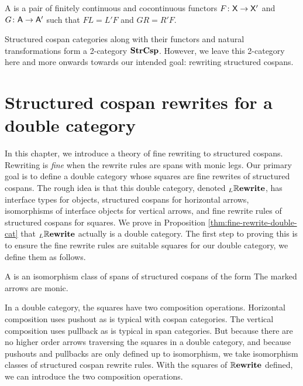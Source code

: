 \documentclass{amsart}
\begin{document}
\begin{definition} \label{def:str-csp-functor}
  A  is a pair
  of finitely continuous and cocontinuous functors
  $ F \colon \mathsf{X} \to \mathsf{X}' $ and $ G \colon \mathsf{A} \to \mathsf{A}' $ such
  that $ FL=L'F $ and $ GR = R'F $.
\end{definition}

Structured cospan categories along with their functors and
natural transformations form a 2-category $ \mathbf{StrCsp}
$. However, we leave this 2-category here and more onwards
towards our intended goal: rewriting structured cospans.

\section{Structured cospan rewrites for a double category}
\label{sec:DblCat}


In this chapter, we introduce a theory of fine rewriting to
structured cospans.  Rewriting is \emph{fine}
when the rewrite rules are spans with monic legs.  Our
primary goal is to define a double category whose squares
are fine rewrites of structured cospans.  The rough idea is
that this double category, denoted $ _L\mathbb{R}\mathbf{ewrite} $, has
interface types for objects, structured cospans for
horizontal arrows, isomorphisms of interface objects for
vertical arrows, and fine rewrite rules of structured
cospans for squares. We prove in Proposition
\ref{thm:fine-rewrite-double-cat} that $ _L\mathbb{R}\mathbf{ewrite} $
actually is a double category. The first step to proving
this is to ensure the fine rewrite rules are suitable squares for
our double category, we define them as follows.

\begin{definition}
  A  is an
  isomorphism class of spans of structured cospans of the
  form  The marked arrows are
  monic.
\end{definition}

In a double category, the squares have two composition
operations.  Horizontal composition uses pushout as is
typical with cospan categories. The vertical composition
uses pullback as is typical in span categories.  But because
there are no higher order arrows traversing the squares in a
double category, and because pushouts and pullbacks are only
defined up to isomorphism, we take isomorphism classes of
structured cospan rewrite rules.  With the squares of
$ \mathbb{R}\mathbf{ewrite} $ defined, we can introduce the two composition
operations.
\end{document}
